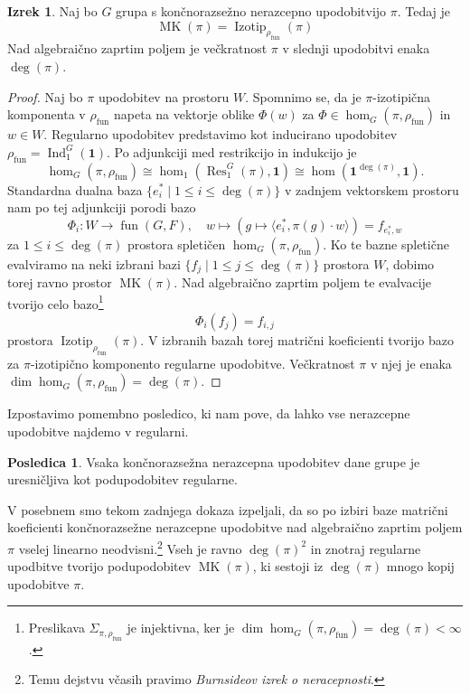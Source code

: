 \documentclass[11pt]{book}
\def\11{\mathbf{1}}
\DeclareMathOperator\Res{Res}
\DeclareMathOperator\Ind{Ind}
\DeclareMathOperator\Izotip{Izotip}
\DeclareMathOperator\MK{MK}
\DeclareMathOperator\fun{fun}
\theoremstyle{definition}
\theoremstyle{zgled}
\theoremstyle{odprtproblem}
\theoremstyle{domacanaloga}
\newenvironment{dokaz}
    {\color{siva}\begin{proof}}
    {\end{proof}}
\theoremstyle{izrek}
\newtheorem*{izrek}{Izrek}
\newtheorem*{posledica}{Posledica}
\begin{document}
\begin{izrek}
Naj bo $G$ grupa s končnorazsežno nerazcepno upodobitvijo $\pi$. Tedaj je
\[
   \textstyle  \MK(\pi) = \Izotip_{\rho_{\fun}}(\pi)
\]
Nad algebraično zaprtim poljem je večkratnost $\pi$ v slednji upodobitvi enaka $\deg(\pi)$.
\end{izrek}
\begin{dokaz}
Naj bo $\pi$ upodobitev na prostoru $W$. Spomnimo se, da je $\pi$-izotipična komponenta v $\rho_{\fun}$ napeta na vektorje oblike $\Phi(w)$ za $\Phi \in \hom_G(\pi, \rho_{\fun})$ in $w \in W$. Regularno upodobitev predstavimo kot inducirano upodobitev $\rho_{\fun} = \Ind^G_1(\11)$. Po adjunkciji med restrikcijo in indukcijo je
\[
    \textstyle \hom_G(\pi, \rho_{\fun}) \cong \hom_1(\Res^G_1(\pi), \11)
    \cong \hom(\11^{\deg(\pi)}, \11).
\]
Standardna dualna baza $\{ e_i^* \mid 1 \leq i \leq \deg(\pi) \}$ v zadnjem vektorskem prostoru nam po tej adjunkciji porodi bazo
\[
    \Phi_i \colon W \to \fun(G,F), \quad
    w \mapsto \left( g \mapsto \langle e_i^*, \pi(g) \cdot w \rangle \right) = f_{e_i^*, w}
\]
za $1 \leq i \leq \deg(\pi)$ prostora spletičen $\hom_G(\pi, \rho_{\fun})$. Ko te bazne spletične evalviramo na neki izbrani bazi $\{ f_j \mid 1 \leq j \leq \deg(\pi) \}$ prostora $W$, dobimo torej ravno prostor $\MK(\pi)$. Nad algebraično zaprtim poljem te evalvacije tvorijo celo bazo\footnote{Preslikava $\Sigma_{\pi, \rho_{\fun}}$ je injektivna, ker je $\dim \hom_G(\pi, \rho_{\fun}) = \deg(\pi) < \infty$.}
\[
    \Phi_i(f_j) = f_{i,j}
\]
prostora $\Izotip_{\rho_{\fun}}(\pi)$. V izbranih bazah torej matrični koeficienti tvorijo bazo za $\pi$-izotipično komponento regularne upodobitve. Večkratnost $\pi$ v njej je enaka $\dim \hom_G(\pi, \rho_{\fun}) = \deg(\pi)$.
\end{dokaz}

Izpostavimo pomembno posledico, ki nam pove, da lahko vse nerazcepne upodobitve najdemo v regularni.

\begin{posledica}
Vsaka končnorazsežna nerazcepna upodobitev dane grupe je uresničljiva kot podupodobitev regularne.
\end{posledica}

V posebnem smo tekom zadnjega dokaza izpeljali, da so po izbiri baze matrični koeficienti končnorazsežne nerazcepne upodobitve nad algebraično zaprtim poljem $\pi$ vselej linearno neodvisni.\footnote{Temu dejstvu včasih pravimo \emph{Burnsideov izrek o neracepnosti}.} Vseh je ravno $\deg(\pi)^2$ in znotraj regularne upodbitve tvorijo podupodobitev $\MK(\pi)$, ki sestoji iz $\deg(\pi)$ mnogo kopij upodobitve $\pi$.
\end{document}
